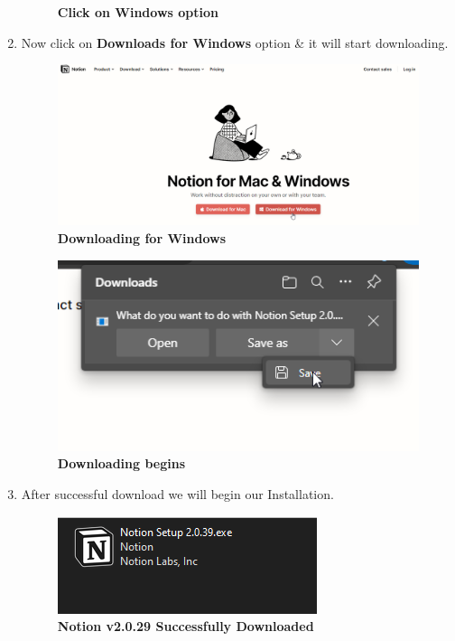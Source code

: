 \begin{enumerate}
\begin{figure}[h]
        \caption{\textbf{Click on Windows option}}
        \label{fig_GN}
        \end{figure}
    \item Now click on \textbf{Downloads for Windows} option \& it will start downloading. 
        \begin{figure}[h]
        \centering
        \includegraphics[scale=0.3]{gfx/3.png}
        \caption{\textbf{Downloading for Windows}}
        \label{fig_GN}
        \end{figure}
        \begin{figure}[h]
        \centering
        \includegraphics[scale=0.3]{gfx/4.png}
        \caption{\textbf{Downloading begins}}
        \label{fig_GN}
        \end{figure}
    \item After successful download we will begin our Installation.
        \begin{figure}[h]
        \centering
        \includegraphics[scale=0.5]{gfx/5.png}
        \caption{\textbf{Notion v2.0.29 Successfully Downloaded}}
        \label{fig_GN}
        \end{figure}
\end{enumerate}
